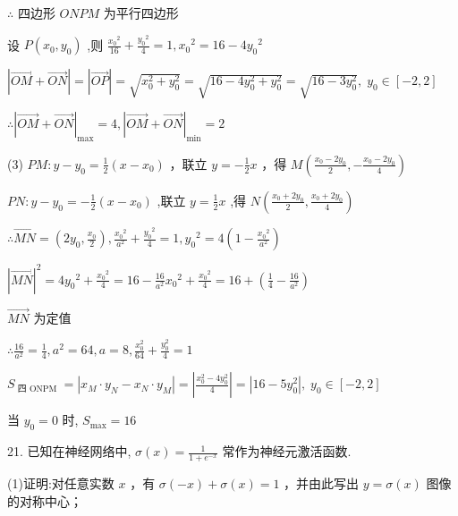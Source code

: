 \documentclass[10pt]{article}
\begin{document}
\(\therefore\) 四边形 \({ONPM}\) 为平行四边形

设 \(P\left( {{x}_{0},{y}_{0}}\right)\) ,则 \(\frac{{x}_{0}{}^{2}}{16} + \frac{{y}_{0}{}^{2}}{4} = 1,{x}_{0}{}^{2} = {16} - 4{y}_{0}{}^{2}\)

\(\left| {\overrightarrow{OM} + \overrightarrow{ON}}\right|  = \left| \overrightarrow{OP}\right|  = \sqrt{{x}_{0}^{2} + {y}_{0}^{2}} = \sqrt{{16} - 4{y}_{0}^{2} + {y}_{0}^{2}} = \sqrt{{16} - 3{y}_{0}^{2}},\;{y}_{0} \in  \left\lbrack  {-2,2}\right\rbrack\)

\(\therefore {\left| \overrightarrow{OM} + \overrightarrow{ON}\right| }_{\max } = 4,{\left| \overrightarrow{OM} + \overrightarrow{ON}\right| }_{\min } = 2\)

(3) \({PM} : y - {y}_{0} = \frac{1}{2}\left( {x - {x}_{0}}\right)\) ，联立 \(y =  - \frac{1}{2}x\) ，得 \(M\left( {\frac{{x}_{0} - 2{y}_{0}}{2}, - \frac{{x}_{0} - 2{y}_{0}}{4}}\right)\)

\({PN} : y - {y}_{0} =  - \frac{1}{2}\left( {x - {x}_{0}}\right)\) ,联立 \(y = \frac{1}{2}x\) ,得 \(N\left( {\frac{{x}_{0} + 2{y}_{0}}{2},\frac{{x}_{0} + 2{y}_{0}}{4}}\right)\)

\(\therefore \overrightarrow{MN} = \left( {2{y}_{0},\frac{{x}_{0}}{2}}\right) ,\frac{{x}_{0}{}^{2}}{{a}^{2}} + \frac{{y}_{0}{}^{2}}{4} = 1,{y}_{0}{}^{2} = 4\left( {1 - \frac{{x}_{0}{}^{2}}{{a}^{2}}}\right)\)

\({\left| \overrightarrow{MN}\right| }^{2} = 4{y}_{0}{}^{2} + \frac{{x}_{0}{}^{2}}{4} = {16} - \frac{16}{{a}^{2}}{x}_{0}{}^{2} + \frac{{x}_{0}{}^{2}}{4} = {16} + \left( {\frac{1}{4} - \frac{16}{{a}^{2}}}\right)\)

\(\overrightarrow{MN}\) 为定值

\(\therefore \frac{16}{{a}^{2}} = \frac{1}{4},{a}^{2} = {64},a = 8,\frac{{x}_{0}^{2}}{64} + \frac{{y}_{0}^{2}}{4} = 1\)

\({S}_{\text{ 四 ONPM }} = \left| {{x}_{M} \cdot  {y}_{N} - {x}_{N} \cdot  {y}_{M}}\right|  = \left| \frac{{x}_{0}^{2} - 4{y}_{0}^{2}}{4}\right|  = \left| {{16} - 5{y}_{0}^{2}}\right| ,\;{y}_{0} \in  \left\lbrack  {-2,2}\right\rbrack\)

当 \({y}_{0} = 0\) 时, \({S}_{\max } = {16}\)

21. 已知在神经网络中, \(\sigma \left( x\right)  = \frac{1}{1 + {e}^{-x}}\) 常作为神经元激活函数.

(1)证明:对任意实数 \(x\) ，有 \(\sigma \left( {-x}\right)  + \sigma \left( x\right)  = 1\) ，并由此写出 \(y = \sigma \left( x\right)\) 图像的对称中心；
\end{document}
